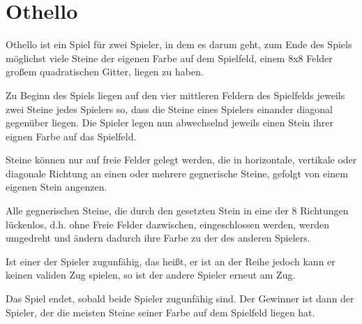 \section{Othello}

Othello ist ein Spiel für zwei Spieler, in dem es darum geht, zum Ende des Spiels möglichst viele Steine der eigenen Farbe auf dem Spielfeld, einem 8x8 Felder großem quadratischen Gitter, liegen zu haben.

Zu Beginn des Spiels liegen auf den vier mittleren Feldern des Spielfelds jeweils zwei Steine jedes Spielers so, dass die Steine eines Spielers einander diagonal gegenüber liegen.
Die Spieler legen nun abwechselnd jeweils einen Stein ihrer eignen Farbe auf das Spielfeld.

Steine können nur auf freie Felder gelegt werden, die in horizontale, vertikale oder diagonale Richtung an einen oder mehrere gegnerische Steine, gefolgt von einem eigenen Stein angenzen.

Alle gegnerischen Steine, die durch den gesetzten Stein in eine der 8 Richtungen lückenlos, d.h. ohne Freie Felder dazwischen, eingeschlossen werden, werden umgedreht und ändern dadurch ihre Farbe zu der des anderen Spielers.

Ist einer der Spieler zugunfähig, das heißt, er ist an der Reihe jedoch kann er keinen validen Zug spielen, so ist der andere Spieler erneut am Zug.

Das Spiel endet, sobald beide Spieler zugunfähig sind. Der Gewinner ist dann der Spieler, der die meisten Steine seiner Farbe auf dem Spielfeld liegen hat.
\cite{worldothellorules}
